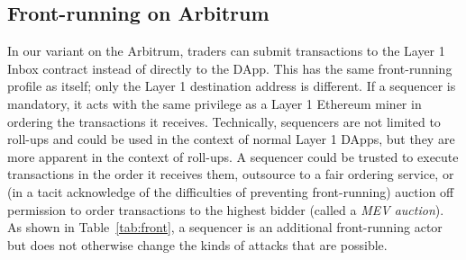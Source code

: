 \subsection{Front-running on Arbitrum}
\label{sec:frontarb}

In our \cm variant on the Arbitrum, traders can submit transactions to the Layer 1 Inbox contract instead of directly to the \cm DApp. This has the same front-running profile as \cm itself; only the Layer 1 destination address is different. If a sequencer is mandatory, it acts with the same privilege as a Layer 1 Ethereum miner in ordering the transactions it receives. Technically, sequencers are not limited to roll-ups and could be used in the context of normal Layer 1 DApps, but they are more apparent in the context of roll-ups. A sequencer could be trusted to execute transactions in the order it receives them, outsource to a fair ordering service, or (in a tacit acknowledge of the difficulties of preventing front-running) auction off permission to order transactions to the highest bidder (called a \textit{MEV auction}). As shown in Table~\ref{tab:front}, a sequencer is an additional front-running actor but does not otherwise change the kinds of attacks that are possible.






